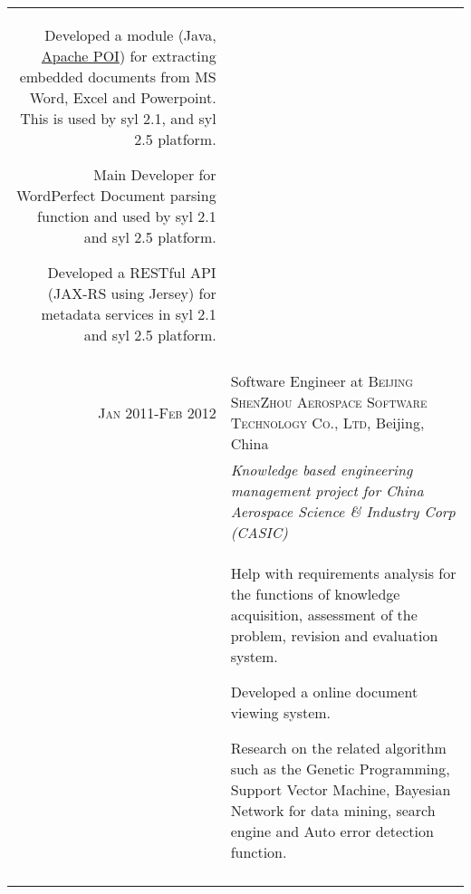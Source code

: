 \documentclass[a4paper,10pt]{article} %
\begin{document}
\begin{tabular}{r|p{11cm}}
{%

Developed a module (Java,  \href{http://poi.apache.org/}{Apache POI}) for extracting embedded documents from MS Word, Excel and Powerpoint. This is used by syl 2.1, and syl 2.5 platform.

Main Developer for WordPerfect Document parsing function and used by syl 2.1 and syl 2.5 platform.

Developed a RESTful API (JAX-RS using Jersey) for metadata services in syl 2.1 and syl 2.5 platform.
}\\
\multicolumn{2}{c}{} \\


%
%


\textsc{Jan 2011-Feb 2012} & Software Engineer at \textsc{Beijing ShenZhou Aerospace Software Technology Co., Ltd}, Beijing, China \\
&\emph{Knowledge based engineering management project for China Aerospace Science \& Industry Corp (CASIC)}\\
& \footnotesize{
Help with requirements analysis for the functions of knowledge acquisition, assessment of the problem, revision and evaluation system.

Developed a online document viewing system.

Research on the related algorithm such as the Genetic Programming, Support Vector Machine, Bayesian Network for data mining, search engine and Auto error detection function.
}\\
\multicolumn{2}{c}{} \\


\end{tabular}
\end{document}
